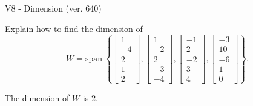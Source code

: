 \begin{exercise}
  \begin{exerciseTitle}V8 - Dimension (ver. 640)\end{exerciseTitle}
  \begin{exerciseStatement}
    Explain how to find the dimension of 
\[W=\mathrm{span}\ \left\{\left[\begin{array}{r}
1 \\
-4 \\
2 \\
1 \\
2
\end{array}\right] , \left[\begin{array}{r}
1 \\
-2 \\
2 \\
-3 \\
-4
\end{array}\right] , \left[\begin{array}{r}
-1 \\
2 \\
-2 \\
3 \\
4
\end{array}\right] , \left[\begin{array}{r}
-3 \\
10 \\
-6 \\
1 \\
0
\end{array}\right]\right\}.\]



  \end{exerciseStatement}
  \begin{exerciseAnswer}
   The dimension of \(W\) is  \(2\).
  


  \end{exerciseAnswer}
\end{exercise}